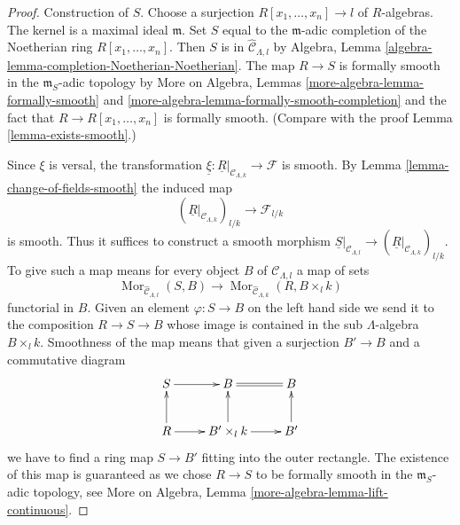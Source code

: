 \documentclass{stacks-project}
\theoremstyle{plain}
\theoremstyle{definition}
\theoremstyle{remark}
\numberwithin{equation}{subsection}
\def\Mor{\mathop{\mathrm{Mor}}\nolimits}
\begin{document}
\begin{proof}
Construction of $S$. Choose a surjection $R[x_1, \ldots, x_n] \to l$
of $R$-algebras. The kernel is a maximal ideal $\mathfrak m$.
Set $S$ equal to the $\mathfrak m$-adic completion of the Noetherian ring
$R[x_1, \ldots, x_n]$. Then $S$ is in $\widehat{\mathcal{C}}_{\Lambda, l}$
by Algebra, Lemma \ref{algebra-lemma-completion-Noetherian-Noetherian}.
The map $R \to S$ is formally smooth in the $\mathfrak m_S$-adic topology by
More on Algebra, Lemmas
\ref{more-algebra-lemma-formally-smooth} and
\ref{more-algebra-lemma-formally-smooth-completion}
and the fact that $R \to R[x_1, \ldots, x_n]$ is formally smooth.
(Compare with the proof Lemma \ref{lemma-exists-smooth}.)

\medskip\noindent
Since $\xi$ is versal, the transformation
$\underline{\xi} : \underline{R}|_{\mathcal{C}_{\Lambda, k}} \to \mathcal{F}$
is smooth. By Lemma \ref{lemma-change-of-fields-smooth} the induced map
$$
(\underline{R}|_{\mathcal{C}_{\Lambda, k}})_{l/k}
\longrightarrow
\mathcal{F}_{l/k}
$$
is smooth. Thus it suffices to construct a smooth morphism
$\underline{S}|_{\mathcal{C}_{\Lambda, l}} \to
(\underline{R}|_{\mathcal{C}_{\Lambda, k}})_{l/k}$.
To give such a map means for every object $B$ of $\mathcal{C}_{\Lambda, l}$
a map of sets
$$
\Mor_{\widehat{\mathcal{C}}_{\Lambda, l}}(S, B)
\longrightarrow
\Mor_{\widehat{\mathcal{C}}_{\Lambda, k}}(R, B \times_l k)
$$
functorial in $B$. Given an element $\varphi : S \to B$
on the left hand side we send it to the composition $R \to S \to B$
whose image is contained in the sub $\Lambda$-algebra $B \times_l k$.
Smoothness of the map means that given a surjection
$B' \to B$ and a commutative diagram
$$
\xymatrix{
S \ar[r] & B \ar@{=}[r] & B \\
R \ar[u] \ar[r] & B' \times_l k \ar[u] \ar[r] & B' \ar[u]
}
$$
we have to find a ring map $S \to B'$ fitting into the outer rectangle.
The existence of this map is guaranteed as we chose $R \to S$ to be
formally smooth in the $\mathfrak m_S$-adic topology, see
More on Algebra, Lemma \ref{more-algebra-lemma-lift-continuous}.
\end{proof}

























\end{document}
